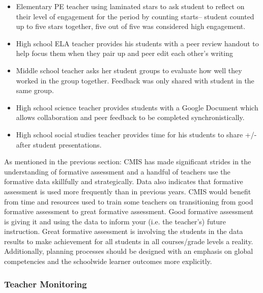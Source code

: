 \begin{findings}
\begin{itemize}
\item Elementary PE teacher using laminated stars to ask student to reflect on their level of engagement for the period by counting starts-- student counted up to five stars together, five out of five was considered high engagement. 
\item High school ELA teacher provides his students with a peer review handout to help focus them when they pair up and peer edit each other’s writing
\item Middle school teacher asks her student groups to evaluate how well they worked in the group together. Feedback was only shared with student in the same group. 
\item High school science teacher provides students with a Google Document which allows collaboration and peer feedback to be completed synchronistically. 
\item High school social studies teacher provides time for his students to share +/- after student presentations. 
\end{itemize}


As mentioned in the previous section: CMIS has made significant strides in the understanding of formative assessment and a handful of teachers use the formative data skillfully and strategically. Data also indicates that formative assessment is used more frequently than in previous years. CMIS would benefit from time and resources used to train some teachers on transitioning from good formative assessment to great formative assessment. Good formative assessment is giving it and using the data to inform your (i.e. the teacher’s) future instruction. Great formative assessment is involving the students in the data results to make achievement for all students in all courses/grade levels a reality. Additionally, planning processes should be designed with an emphasis on global competencies and the schoolwide learner outcomes more explicitly. 
\end{findings}

\subsubsection{Teacher Monitoring}


